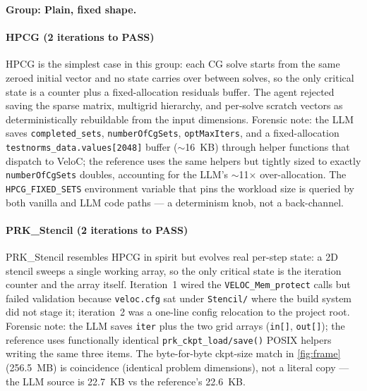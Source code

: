 \documentclass[conference]{IEEEtran}
\begin{document}
\smallskip\noindent\textbf{Group: Plain, fixed shape.}

\paragraph{HPCG (2 iterations to PASS)}
HPCG is the simplest case in this group: each CG solve starts from the same zeroed initial vector and no state carries over between solves, so the only critical state is a counter plus a fixed-allocation residuals buffer. The agent rejected saving the sparse matrix, multigrid hierarchy, and per-solve scratch vectors as deterministically rebuildable from the input dimensions. Forensic note: the LLM saves \texttt{completed\_sets}, \texttt{numberOfCgSets}, \texttt{optMaxIters}, and a fixed-allocation \texttt{testnorms\_data.values[2048]} buffer ($\sim$16~KB) through helper functions that dispatch to VeloC; the reference uses the same helpers but tightly sized to exactly \texttt{numberOfCgSets} doubles, accounting for the LLM's $\sim$11$\times$ over-allocation. The \texttt{HPCG\_FIXED\_SETS} environment variable that pins the workload size is queried by both vanilla and LLM code paths --- a determinism knob, not a back-channel.

\paragraph{PRK\_Stencil (2 iterations to PASS)}
PRK\_Stencil resembles HPCG in spirit but evolves real per-step state: a 2D stencil sweeps a single working array, so the only critical state is the iteration counter and the array itself. Iteration~1 wired the \texttt{VELOC\_Mem\_protect} calls but failed validation because \texttt{veloc.cfg} sat under \texttt{Stencil/} where the build system did not stage it; iteration~2 was a one-line config relocation to the project root. Forensic note: the LLM saves \texttt{iter} plus the two grid arrays (\texttt{in[]}, \texttt{out[]}); the reference uses functionally identical \texttt{prk\_ckpt\_load/save()} POSIX helpers writing the same three items. The byte-for-byte ckpt-size match in \autoref{fig:frame} (256.5~MB) is coincidence (identical problem dimensions), not a literal copy --- the LLM source is 22.7~KB vs the reference's 22.6~KB.
\end{document}
